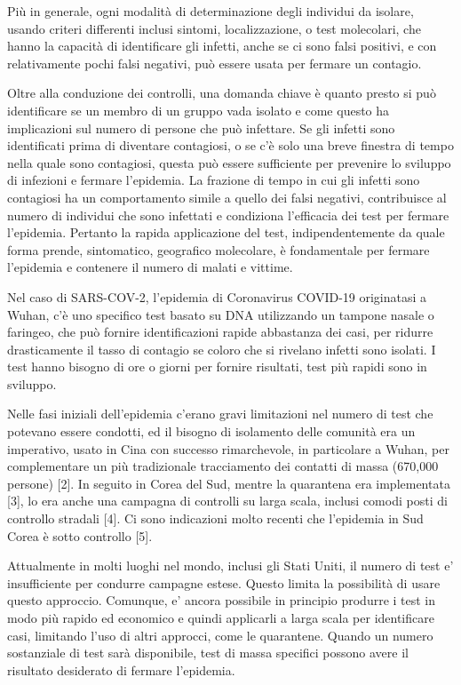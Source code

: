 \documentclass[onecolumn,journal]{IEEEtran}
\begin{document}
\begin{multicols}{2}
\begin{itemize}
\end{itemize}

Più in generale, ogni modalità di determinazione degli individui da isolare, usando criteri differenti inclusi sintomi, localizzazione, o test molecolari, che hanno la capacità di identificare gli infetti, anche se ci sono falsi positivi, e con relativamente pochi falsi negativi, può essere usata per fermare un contagio.

Oltre alla conduzione dei controlli, una domanda chiave è quanto presto si può identificare se un membro di un gruppo vada isolato e come questo ha implicazioni sul numero di persone che può infettare. Se gli infetti sono identificati prima di diventare contagiosi, o se c'è solo una breve finestra di tempo nella quale sono contagiosi, questa può essere sufficiente per prevenire lo sviluppo di infezioni e fermare l’epidemia. La frazione di tempo in cui gli infetti sono contagiosi ha un comportamento simile a quello dei falsi negativi, contribuisce al numero di individui che sono infettati e condiziona l’efficacia dei test per fermare l’epidemia. Pertanto la rapida applicazione del test, indipendentemente da quale forma prende, sintomatico, geografico molecolare, è fondamentale per fermare l’epidemia e contenere il numero di malati e vittime.

Nel caso di SARS-COV-2, l’epidemia di Coronavirus COVID-19 originatasi a Wuhan, c’è uno specifico test basato su DNA utilizzando un tampone nasale o faringeo, che può fornire identificazioni rapide abbastanza dei casi, per ridurre drasticamente il tasso di contagio se coloro che si rivelano infetti sono isolati. I test hanno bisogno di ore o giorni per fornire risultati, test più rapidi sono in sviluppo.

Nelle fasi iniziali dell’epidemia c’erano gravi limitazioni nel numero di test che potevano essere condotti, ed il bisogno di isolamento delle comunità era un imperativo, usato in Cina con successo rimarchevole, in particolare a Wuhan, per complementare un più tradizionale tracciamento dei contatti di massa (670,000 persone) [2]. In seguito in Corea del Sud, mentre la quarantena era implementata [3], lo era anche una campagna di controlli su larga scala, inclusi comodi posti di controllo stradali [4]. Ci sono indicazioni molto recenti che l’epidemia in Sud Corea è sotto controllo [5].

Attualmente in molti luoghi nel mondo, inclusi gli Stati Uniti, il numero di test e’ insufficiente per condurre campagne estese. Questo limita la possibilità di usare questo approccio. Comunque, e’ ancora possibile in principio produrre i test in modo più rapido ed economico e quindi applicarli a larga scala per identificare casi, limitando l’uso di altri approcci, come le quarantene. Quando un numero sostanziale di test sarà disponibile, test di massa specifici possono avere il risultato desiderato di fermare l’epidemia.


\end{multicols}
\end{document}
